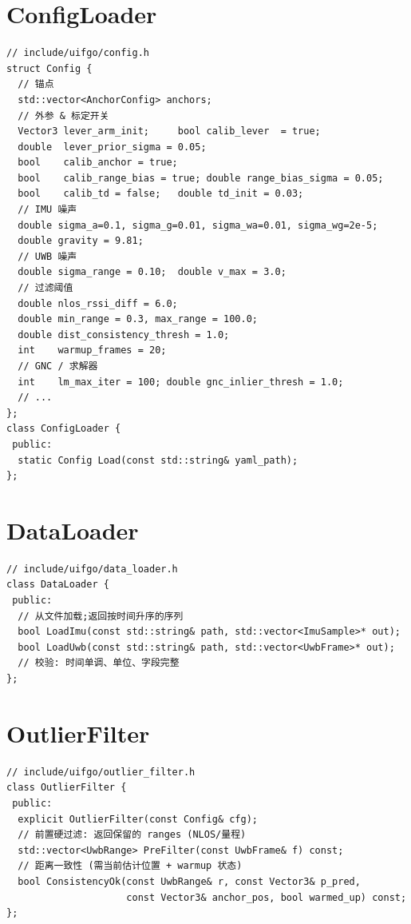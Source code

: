 \documentclass[11pt,a4paper]{report}
\begin{document}
\section{ConfigLoader}
\begin{lstlisting}[style=cpp]
// include/uifgo/config.h
struct Config {
  // 锚点
  std::vector<AnchorConfig> anchors;
  // 外参 & 标定开关
  Vector3 lever_arm_init;     bool calib_lever  = true;
  double  lever_prior_sigma = 0.05;
  bool    calib_anchor = true;
  bool    calib_range_bias = true; double range_bias_sigma = 0.05;
  bool    calib_td = false;   double td_init = 0.03;
  // IMU 噪声
  double sigma_a=0.1, sigma_g=0.01, sigma_wa=0.01, sigma_wg=2e-5;
  double gravity = 9.81;
  // UWB 噪声
  double sigma_range = 0.10;  double v_max = 3.0;
  // 过滤阈值
  double nlos_rssi_diff = 6.0;
  double min_range = 0.3, max_range = 100.0;
  double dist_consistency_thresh = 1.0;
  int    warmup_frames = 20;
  // GNC / 求解器
  int    lm_max_iter = 100; double gnc_inlier_thresh = 1.0;
  // ...
};
class ConfigLoader {
 public:
  static Config Load(const std::string& yaml_path);
};
\end{lstlisting}

\section{DataLoader}
\begin{lstlisting}[style=cpp]
// include/uifgo/data_loader.h
class DataLoader {
 public:
  // 从文件加载;返回按时间升序的序列
  bool LoadImu(const std::string& path, std::vector<ImuSample>* out);
  bool LoadUwb(const std::string& path, std::vector<UwbFrame>* out);
  // 校验: 时间单调、单位、字段完整
};
\end{lstlisting}

\section{OutlierFilter}
\begin{lstlisting}[style=cpp]
// include/uifgo/outlier_filter.h
class OutlierFilter {
 public:
  explicit OutlierFilter(const Config& cfg);
  // 前置硬过滤: 返回保留的 ranges (NLOS/量程)
  std::vector<UwbRange> PreFilter(const UwbFrame& f) const;
  // 距离一致性 (需当前估计位置 + warmup 状态)
  bool ConsistencyOk(const UwbRange& r, const Vector3& p_pred,
                     const Vector3& anchor_pos, bool warmed_up) const;
};
\end{lstlisting}
\end{document}
